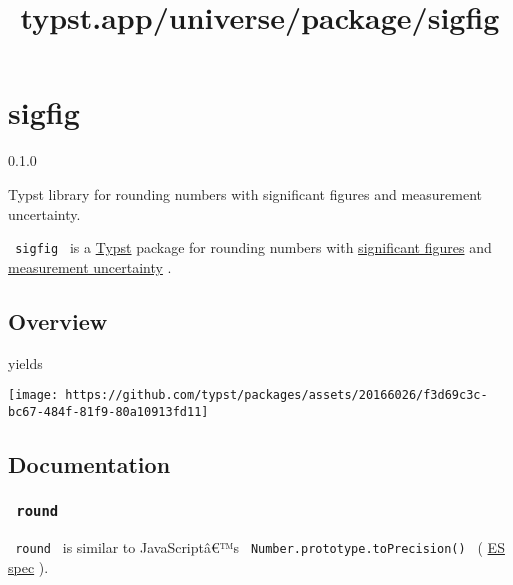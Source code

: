 \title{typst.app/universe/package/sigfig}

\label{banner}
\section{sigfig}\label{sigfig}

{ 0.1.0 }

Typst library for rounding numbers with significant figures and
measurement uncertainty.

\label{readme}
\texttt{\ sigfig\ } is a \href{https://typst.app/}{Typst} package for
rounding numbers with
\href{https://en.wikipedia.org/wiki/Significant_figures}{significant
figures} and
\href{https://en.wikipedia.org/wiki/Measurement_uncertainty}{measurement
uncertainty} .

\subsection{Overview}\label{overview}

\begin{Shaded}
\begin{Highlighting}[]

\end{Highlighting}
\end{Shaded}

yields

\texttt{[image: https://github.com/typst/packages/assets/20166026/f3d69c3c-bc67-484f-81f9-80a10913fd11]}

\subsection{Documentation}\label{documentation}

\subsubsection{\texorpdfstring{\texttt{\ round\ }}{ round }}\label{round}

\texttt{\ round\ } is similar to JavaScriptâ€™s
\texttt{\ Number.prototype.toPrecision()\ } (
\href{https://tc39.es/ecma262/multipage/numbers-and-dates.html\#sec-number.prototype.toprecision}{ES
spec} ).

